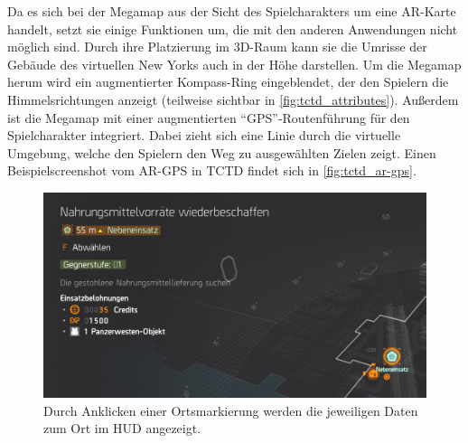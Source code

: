 Da es sich bei der Megamap aus der Sicht des Spielcharakters um eine AR-Karte handelt, setzt sie einige Funktionen um, die mit den anderen Anwendungen nicht möglich sind.
Durch ihre Platzierung im 3D-Raum kann sie die Umrisse der Gebäude des virtuellen New Yorks auch in der Höhe darstellen.
Um die Megamap herum wird ein augmentierter Kompass-Ring eingeblendet, der den Spielern die Himmelsrichtungen anzeigt (teilweise sichtbar in \autoref{fig:tctd_attributes}).
Außerdem ist die Megamap mit einer augmentierten \enquote{GPS}-Routenführung für den Spielcharakter integriert.
Dabei zieht sich eine Linie durch die virtuelle Umgebung, welche den Spielern den Weg zu ausgewählten Zielen zeigt.
Einen Beispielscreenshot vom AR-GPS in TCTD findet sich in \autoref{fig:tctd_ar-gps}.

\begin{figure}[p]
    \centering
    \includegraphics[width=\linewidth]{figures/concept/the_division_attributes_x}
    \caption{Durch Anklicken einer Ortsmarkierung werden die jeweiligen Daten zum Ort im HUD angezeigt.}
    \label{fig:tctd_attributes}
\end{figure}
